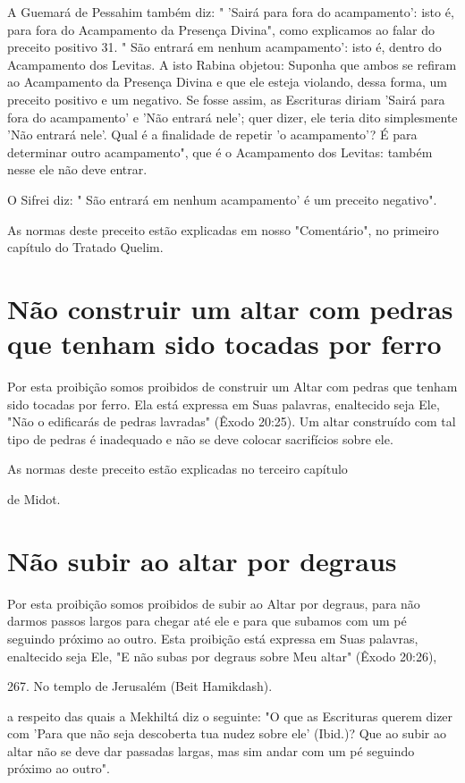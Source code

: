 \begin{itemize}
\begin{enumrate}
\begin{itemize}
\begin{itemize}
\begin{itemize}
A Guemará de Pessahim também diz: " 'Sairá para fora do acampa­mento':
isto é, para fora do Acampamento da Presença Divina", como explica­mos
ao falar do preceito positivo 31. " São entrará em nenhum acampamen­to':
isto é, dentro do Acampamento dos Levitas. A isto Rabina objetou:
Supo­nha que ambos se refiram ao Acampamento da Presença Divina e que
ele esteja violando, dessa forma, um preceito positivo e um negativo. Se
fosse assim, as Escrituras diriam 'Sairá para fora do acampamento' e
'Não entrará nele'; quer dizer, ele teria dito simplesmente 'Não entrará
nele'. Qual é a finalidade de re­petir 'o acampamento'? É para
determinar outro acampamento", que é o Acam­pamento dos Levitas: também
nesse ele não deve entrar.

O Sifrei diz: " São entrará em nenhum acampamento' é um precei­to
negativo".

As normas deste preceito estão explicadas em nosso "Comentário", no
primeiro capítulo do Tratado Quelim.


\section{Não construir um altar com pedras que tenham sido tocadas por ferro}


Por esta proibição somos proibidos de construir um Altar com pe­dras que
tenham sido tocadas por ferro. Ela está expressa em Suas palavras,
enal­tecido seja Ele, "Não o edificarás de pedras lavradas" (Êxodo
20:25). Um altar construído com tal tipo de pedras é inadequado e não se
deve colocar sacrifí­cios sobre ele.


As normas deste preceito estão explicadas no terceiro capítulo


de Midot.

\section{Não subir ao altar por degraus}

Por esta proibição somos proibidos de subir ao Altar por degraus, para
não darmos passos largos para chegar até ele e para que subamos com um
pé seguindo próximo ao outro. Esta proibição está expressa em Suas
palavras, enaltecido seja Ele, "E não subas por degraus sobre Meu altar"
(Êxodo 20:26),

267. No templo de Jerusalém (Beit Hamikdash).

a respeito das quais a Mekhiltá diz o seguinte: "O que as Escrituras
querem di­zer com 'Para que não seja descoberta tua nudez sobre ele'
(Ibid.)? Que ao su­bir ao altar não se deve dar passadas largas, mas sim
andar com um pé seguindo próximo ao outro".


\end{itemize}
\end{itemize}
\end{itemize}
\end{enumrate}
\end{itemize}
